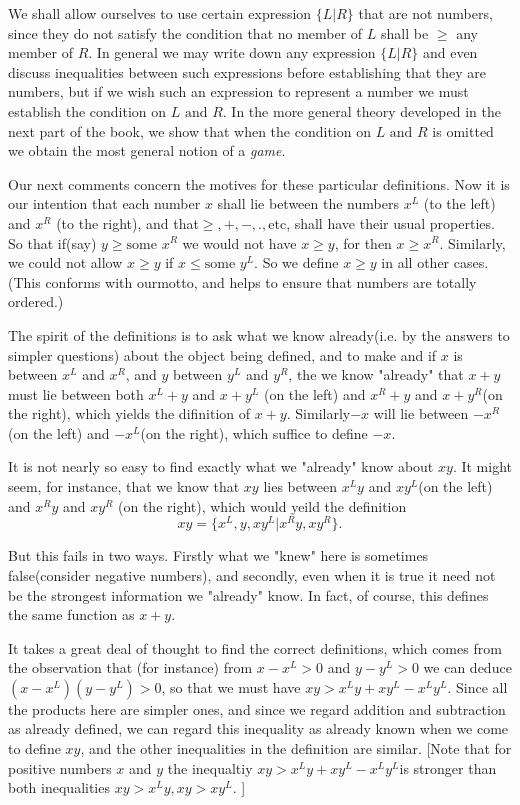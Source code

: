 \documentclass[10pt,a4paper]{book}
\begin{document}
We shall allow ourselves to use certain expression $ \{L|R\} $ that are not numbers, since they do not satisfy the condition that no member of $ L $ shall be $ \ge $ any member of $ R $. In general we may write down any expression $ \{L|R\} $ and even discuss inequalities between such expressions before establishing that they are numbers, but if we wish such an expression to represent a number we must establish the condition on $ L \text{ and } R $. In the more general theory developed in the next part of the book, we show that when the condition on $ L \text{ and } R $
 is omitted we obtain the most general notion of a \textit{game}.

Our next comments concern the motives for these particular definitions. Now it is our intention that each number $ x $ shall lie between the numbers $ x^L $ (to the left) and $ x^R $ (to the right), and that$ \ge, +, -,., \text{etc} $, shall have their usual properties. So that if(say) $ y\ge\text{some } x^R $ we would not have $ x\ge y $, for then $ x\ge x^R $. Similarly, we could not allow $ x\ge y $ if $ x \le \text{some }y^L $. So we define $ x\ge y $ in all other cases. (This conforms with ourmotto, and helps to ensure that numbers are totally ordered.)

The spirit of the definitions is to ask what we know already(i.e. by the answers to simpler questions) about the object being defined, and to make and if $ x $ is between $ x^L $ and $ x^R $, and $ y $ between $ y^L $ and $ y^R $, the we know "already" that $ x+y $ must lie between both $ x^L+y $ and $ x+y^L $ (on the left) and $ x^R+y $ and $ x+y^R $(on the right), which yields the difinition of $ x+y $. Similarly$ -x $ will lie between $ -x^R $(on the left) and $ -x^L $(on the right), which suffice to define $ -x $.

It is not nearly so easy to find exactly what we "already" know about $ xy $. It might seem, for instance, that we know that $ xy $ lies between $ x^Ly $ and $ xy^L $(on the left) and $ x^Ry $ and $ xy^R $ (on the right), which would yeild the definition
\[ xy=\{x^L,y, xy^L| x^Ry,xy^R\}. \]

But this fails in two ways. Firstly what we "knew" here is sometimes false(consider negative numbers), and secondly, even when it is true it need not be the strongest information we "already" know. In fact, of course, this defines the same function as $ x+y $.

It takes a great deal of thought to find the correct definitions, which comes from the observation that (for instance) from $ x-x^L > 0 $ and $ y - y^L >0 $ we can deduce $ (x-x^L)(y-y^L)>0 $, so that we must have $ xy>x^Ly+xy^L-x^Ly^L $. Since all the products here are simpler ones, and since we regard addition and subtraction as already defined, we can regard this inequality as already known when we come to define $ xy $, and the other inequalities in the definition are similar. [Note that for positive numbers $ x $ and $ y $ the inequaltiy $ xy>x^Ly+xy^L-x^Ly^L $is stronger than both inequalities $ xy>x^Ly, xy>xy^L $. ]
\end{document}
